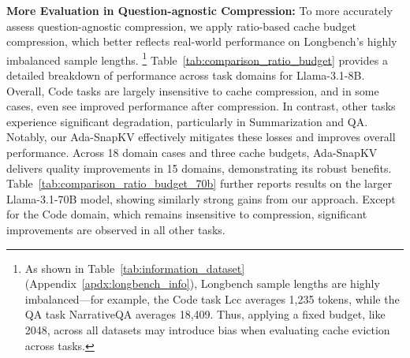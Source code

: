 \textbf{More Evaluation in Question-agnostic Compression:}  
To more accurately assess question-agnostic compression, we apply ratio-based cache budget compression, which better reflects real-world performance on Longbench’s highly imbalanced sample lengths. \footnote{As shown in Table~\ref{tab:information_dataset} (Appendix~\ref{apdx:longbench_info}), Longbench sample lengths are highly imbalanced—for example, the Code task Lcc averages 1,235 tokens, while the QA task NarrativeQA averages 18,409. Thus, applying a fixed budget, like 2048, across all datasets may introduce bias when evaluating cache eviction across tasks.} Table~\ref{tab:comparison_ratio_budget} provides a detailed breakdown of performance across task domains for Llama-3.1-8B. Overall, Code tasks are largely insensitive to cache compression, and in some cases, even see improved performance after compression. In contrast, other tasks experience significant degradation, particularly in Summarization and QA. Notably, our Ada-SnapKV effectively mitigates these losses and improves overall performance. Across 18 domain cases and three cache budgets, Ada-SnapKV delivers quality improvements in 15 domains, demonstrating its robust benefits. Table~\ref{tab:comparison_ratio_budget_70b} further reports results on the larger Llama-3.1-70B model, showing similarly strong gains from our approach. Except for the Code domain, which remains insensitive to compression, significant improvements are observed in all other tasks.




